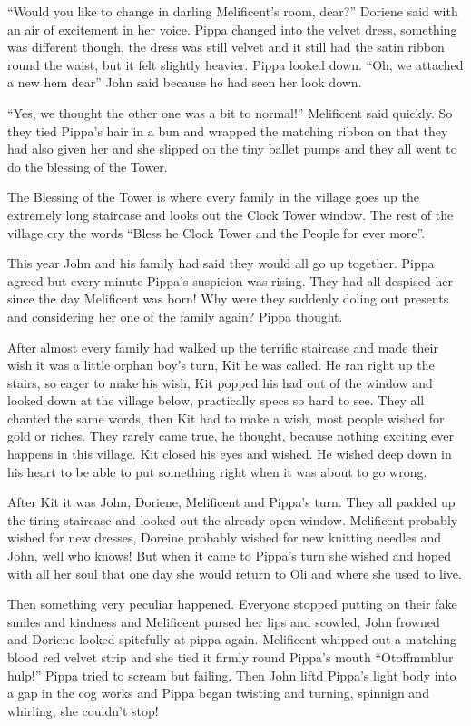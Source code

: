 ``Would you like to change in darling Melificent's room, dear?'' Doriene
said with an air of excitement in her voice. Pippa changed into the
velvet dress, something was different though, the dress was still velvet
and it still had the satin ribbon round the waist, but it felt slightly
heavier. Pippa looked down. ``Oh, we attached a new hem dear'' John said
because he had seen her look down.

``Yes, we thought the other one was a bit to normal!'' Melificent said
quickly. So they tied Pippa's hair in a bun and wrapped the matching
ribbon on that they had also given her and she slipped on the tiny
ballet pumps and they all went to do the blessing of the Tower.

The Blessing of the Tower is where every family in the village goes up
the extremely long staircase and looks out the Clock Tower window. The
rest of the village cry the words ``Bless he Clock Tower and the People
for ever more''.

This year John and his family had said they would all go up together.
Pippa agreed but every minute Pippa's suspicion was rising. They had all
despised her since the day Melificent was born! Why were they suddenly
doling out presents and considering her one of the family again? Pippa
thought.

After almost every family had walked up the terrific staircase and made
their wish it was a little orphan boy's turn, Kit he was called. He ran
right up the stairs, so eager to make his wish, Kit popped his had out
of the window and looked down at the village below, practically specs so
hard to see. They all chanted the same words, then Kit had to make a
wish, most people wished for gold or riches. They rarely came true, he
thought, because nothing exciting ever happens in this village. Kit
closed his eyes and wished. He wished deep down in his heart to be able
to put something right when it was about to go wrong.

After Kit it was John, Doriene, Melificent and Pippa's turn. They all
padded up the tiring staircase and looked out the already open window.
Melificent probably wished for new dresses, Doreine probably wished for
new knitting needles and John, well who knows! But when it came to
Pippa's turn she wished and hoped with all her soul that one day she
would return to Oli and where she used to live.

Then something very peculiar happened. Everyone stopped putting on their
fake smiles and kindness and Melificent pursed her lips and scowled,
John frowned and Doriene looked spitefully at pippa again. Melificent
whipped out a matching blood red velvet strip and she tied it firmly
round Pippa's mouth ``Otoffmmblur hulp!'' Pippa tried to scream but
failing. Then John liftd Pippa's light body into a gap in the cog works
and Pippa began twisting and turning, spinnign and whirling, she
couldn't stop!

